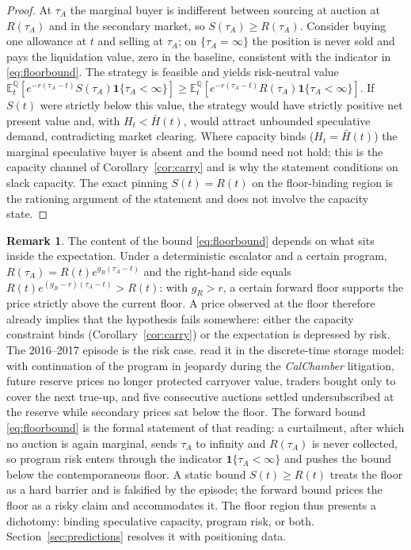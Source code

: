 \documentclass[11pt,letterpaper]{article}
\theoremstyle{plain}
\theoremstyle{definition}
\newtheorem{remark}[theorem]{Remark}
\newcommand{\E}{\mathbb{E}}                  %
\newcommand{\Qmeasure}{\mathbb{Q}}           %
\numberwithin{equation}{section}
\begin{document}
\begin{proof}
At $\tau_A$ the marginal buyer is indifferent between sourcing at auction at $R(\tau_A)$ and in the secondary market, so $S(\tau_A)\ge R(\tau_A)$. Consider buying one allowance at $t$ and selling at $\tau_A$; on $\{\tau_A=\infty\}$ the position is never sold and pays the liquidation value, zero in the baseline, consistent with the indicator in \eqref{eq:floorbound}. The strategy is feasible and yields risk-neutral value $\E_t^{\Qmeasure}[e^{-r(\tau_A-t)}S(\tau_A)\mathbf{1}\{\tau_A<\infty\}]\ge\E_t^{\Qmeasure}[e^{-r(\tau_A-t)}R(\tau_A)\mathbf{1}\{\tau_A<\infty\}]$. If $S(t)$ were strictly below this value, the strategy would have strictly positive net present value and, with $H_t<\bar H(t)$, would attract unbounded speculative demand, contradicting market clearing. Where capacity binds ($H_t=\bar H(t)$) the marginal speculative buyer is absent and the bound need not hold; this is the capacity channel of Corollary~\ref{cor:carry} and is why the statement conditions on slack capacity. The exact pinning $S(t)=R(t)$ on the floor-binding region is the rationing argument of the statement and does not involve the capacity state.
\end{proof}

\begin{remark}\label{rem:2016}
The content of the bound \eqref{eq:floorbound} depends on what sits inside the expectation. Under a deterministic escalator and a certain program, $R(\tau_A)=R(t)e^{g_R(\tau_A-t)}$ and the right-hand side equals $R(t)e^{(g_R-r)(\tau_A-t)}>R(t)$: with $g_R>r$, a certain forward floor supports the price strictly above the current floor. A price observed at the floor therefore already implies that the hypothesis fails somewhere: either the capacity constraint binds (Corollary~\ref{cor:carry}) or the expectation is depressed by risk. The 2016--2017 episode is the risk case. \citet{salant2022} read it in the discrete-time storage model: with continuation of the program in jeopardy during the \emph{CalChamber} litigation, future reserve prices no longer protected carryover value, traders bought only to cover the next true-up, and five consecutive auctions settled undersubscribed at the reserve while secondary prices sat below the floor. The forward bound \eqref{eq:floorbound} is the formal statement of that reading: a curtailment, after which no auction is again marginal, sends $\tau_A$ to infinity and $R(\tau_A)$ is never collected, so program risk enters through the indicator $\mathbf{1}\{\tau_A<\infty\}$ and pushes the bound below the contemporaneous floor. A static bound $S(t)\ge R(t)$ treats the floor as a hard barrier and is falsified by the episode; the forward bound prices the floor as a risky claim and accommodates it. The floor region thus presents a dichotomy: binding speculative capacity, program risk, or both. Section~\ref{sec:predictions} resolves it with positioning data.
\end{remark}
\end{document}
